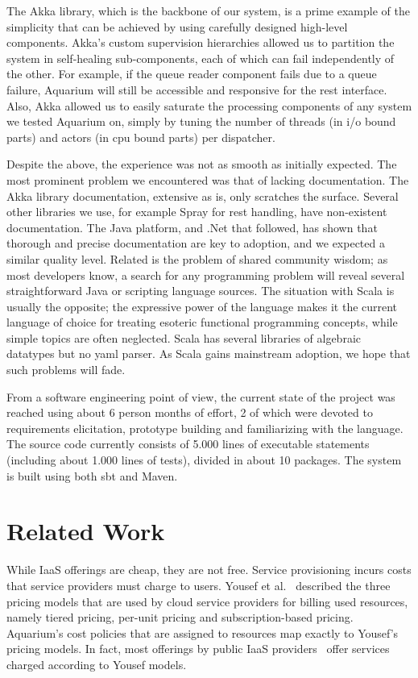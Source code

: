\documentclass[preprint,10pt]{sigplanconf}
\begin{document}
The Akka library, which is the backbone of our system, is a prime example of 
the simplicity that can be achieved by using carefully designed high-level
components. Akka's custom supervision hierarchies allowed us to partition the
system in self-healing sub-components, each of which can fail independently
of the other. For example, if the queue reader component fails due to a queue
failure, Aquarium will still be accessible and responsive for the {\sc rest}
interface. Also, Akka allowed us to easily saturate the processing components
of any system we tested Aquarium on, simply by tuning the number of threads (in
{\sc i/o} bound parts) and actors (in {\sc cpu} bound parts) per dispatcher. 

Despite the above, the experience was not as smooth as initially expected. The
most prominent problem we encountered was that of lacking documentation. The
Akka library documentation, extensive as is, only scratches the surface.
Several other libraries we use, for example Spray for {\sc rest} handling, have
non-existent documentation. The Java platform, and .Net that followed, has
shown that thorough and precise documentation are key to adoption, and we
expected a similar quality level. Related is the problem of shared community
wisdom; as most developers know, a search for any programming problem will
reveal several straightforward Java or scripting language sources. The
situation with Scala is usually the opposite; the expressive power of the
language makes it the current language of choice for treating esoteric
functional programming concepts, while simple topics are often neglected. Scala
has several libraries of algebraic datatypes but no {\sc yaml} parser. As Scala
gains mainstream adoption, we hope that such problems will fade.

From a software engineering point of view, the current state of the project was
reached using about 6 person months of effort, 2 of which were devoted to
requirements elicitation, prototype building and familiarizing with the
language. The source code currently consists of 5.000 lines of executable
statements (including about 1.000 lines of tests), divided in about 10
packages. The system is built using both {\sc sbt} and Maven. 


\section{Related Work}

While IaaS offerings are cheap, they are not free. Service provisioning
incurs costs that service providers must charge to users. Yousef et
al.~\cite{Youse08} described the three pricing models that are used by cloud
service providers for billing used resources, namely tiered pricing, per-unit
pricing and subscription-based pricing. Aquarium's cost policies that are
assigned to resources map exactly to Yousef's pricing models. In fact,
most offerings by public IaaS providers~\cite{Azure12, Amaz12} offer
services charged according to Yousef models.
\end{document}
